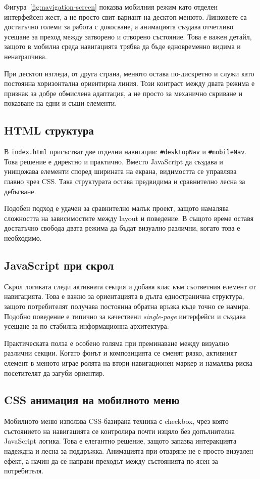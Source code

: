 \documentclass[11pt,a4paper]{article}
\begin{document}
Фигура~\ref{fig:navigation-screen} показва мобилния режим като отделен интерфейсен жест, а не просто свит вариант на десктоп менюто. Линковете са достатъчно големи за работа с докосване, а анимацията създава отчетливо усещане за преход между затворено и отворено състояние. Това е важен детайл, защото в мобилна среда навигацията трябва да бъде едновременно видима и ненатрапчива.

При десктоп изгледа, от друга страна, менюто остава по-дискретно и служи като постоянна хоризонтална ориентирна линия. Този контраст между двата режима е признак за добре обмислена адаптация, а не просто за механично скриване и показване на едни и същи елементи.

\subsection{HTML структура}
В \texttt{index.html} присъстват две отделни навигации: \texttt{\#desktopNav} и \texttt{\#mobileNav}. Това решение е директно и практично. Вместо JavaScript да създава и унищожава елементи според ширината на екрана, видимостта се управлява главно чрез CSS. Така структурата остава предвидима и сравнително лесна за дебъгване.

Подобен подход е удачен за сравнително малък проект, защото намалява сложността на зависимостите между layout и поведение. В същото време оставя достатъчно свобода двата режима да бъдат визуално различни, когато това е необходимо.

\subsection{JavaScript при скрол}
Скрол логиката следи активната секция и добавя клас към съответния елемент от навигацията. Това е важно за ориентацията в дълга едностранична структура, защото потребителят получава постоянна обратна връзка къде точно се намира. Подобно поведение е типично за качествени \textit{single-page} интерфейси и създава усещане за по-стабилна информационна архитектура.

Практическата полза е особено голяма при преминаване между визуално различни секции. Когато фонът и композицията се сменят рязко, активният елемент в менюто играе ролята на втори навигационен маркер и намалява риска посетителят да загуби ориентир.

\subsection{CSS анимация на мобилното меню}
Мобилното меню използва CSS-базирана техника с checkbox, чрез която състоянието на навигацията се контролира почти изцяло без допълнителна JavaScript логика. Това е елегантно решение, защото запазва интеракцията надеждна и лесна за поддръжка. Анимацията при отваряне не е просто визуален ефект, а начин да се направи преходът между състоянията по-ясен за потребителя.
\end{document}
